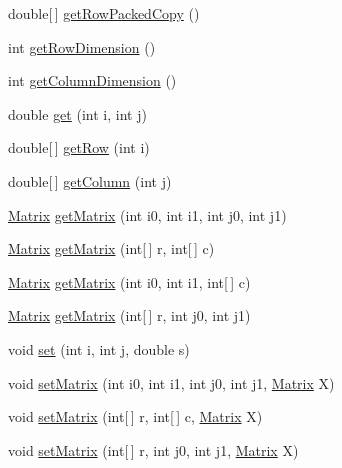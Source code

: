 \begin{DoxyCompactItemize}
\item 
double\mbox{[}$\,$\mbox{]} \hyperlink{class_jama_1_1_matrix_a4740d11abbac942d0f5873e55e1846c0}{get\+Row\+Packed\+Copy} ()
\item 
int \hyperlink{class_jama_1_1_matrix_a1696a4fbbbc49c0e4ac665d104b3af1d}{get\+Row\+Dimension} ()
\item 
int \hyperlink{class_jama_1_1_matrix_ab3d646f9fb632a02ebac93c9118ab16a}{get\+Column\+Dimension} ()
\item 
double \hyperlink{class_jama_1_1_matrix_a4570cadbd1f4ccf87e21ecbcfe5f471f}{get} (int i, int j)
\item 
double\mbox{[}$\,$\mbox{]} \hyperlink{class_jama_1_1_matrix_a2abc91fe8b387894bda1ff7a793c7b9d}{get\+Row} (int i)
\item 
double\mbox{[}$\,$\mbox{]} \hyperlink{class_jama_1_1_matrix_a679eb65734d2d2922d833761da542345}{get\+Column} (int j)
\item 
\hyperlink{class_jama_1_1_matrix}{Matrix} \hyperlink{class_jama_1_1_matrix_a57f8f5d1829fee7c9de644e349283b9b}{get\+Matrix} (int i0, int i1, int j0, int j1)
\item 
\hyperlink{class_jama_1_1_matrix}{Matrix} \hyperlink{class_jama_1_1_matrix_a10b0003d78c24c1041712e0829d0b7f3}{get\+Matrix} (int\mbox{[}$\,$\mbox{]} r, int\mbox{[}$\,$\mbox{]} c)
\item 
\hyperlink{class_jama_1_1_matrix}{Matrix} \hyperlink{class_jama_1_1_matrix_aa60bbca27d77dc5c9ae697e83885a4d8}{get\+Matrix} (int i0, int i1, int\mbox{[}$\,$\mbox{]} c)
\item 
\hyperlink{class_jama_1_1_matrix}{Matrix} \hyperlink{class_jama_1_1_matrix_a29c1e0ffd358c7294fa2195293dfad5b}{get\+Matrix} (int\mbox{[}$\,$\mbox{]} r, int j0, int j1)
\item 
void \hyperlink{class_jama_1_1_matrix_a46de3040517d1238ae802820acc3b2b5}{set} (int i, int j, double s)
\item 
void \hyperlink{class_jama_1_1_matrix_a80e1f77fbd4ddff32165524cd9c9b0b5}{set\+Matrix} (int i0, int i1, int j0, int j1, \hyperlink{class_jama_1_1_matrix}{Matrix} X)
\item 
void \hyperlink{class_jama_1_1_matrix_a1b2db3b489eb022db878ae121202c1e7}{set\+Matrix} (int\mbox{[}$\,$\mbox{]} r, int\mbox{[}$\,$\mbox{]} c, \hyperlink{class_jama_1_1_matrix}{Matrix} X)
\item 
void \hyperlink{class_jama_1_1_matrix_a1003d64f2b403909f74413745fc8fe93}{set\+Matrix} (int\mbox{[}$\,$\mbox{]} r, int j0, int j1, \hyperlink{class_jama_1_1_matrix}{Matrix} X)
\item 

\end{DoxyCompactItemize}
